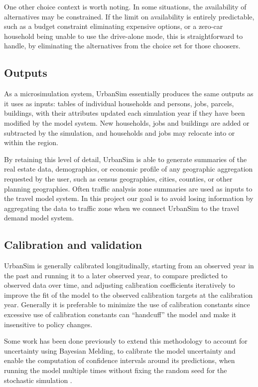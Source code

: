 One other choice context is worth noting. In some situations, the availability of alternatives may be constrained. If the limit on availability is entirely predictable, such as a budget constraint eliminating expensive options, or a zero-car household being unable to use the drive-alone mode, this is straightforward to handle, by eliminating the alternatives from the choice set for those choosers.


\subsection{Outputs}

As a microsimulation system, UrbanSim essentially produces the same outputs as it uses as inputs: tables of individual households and persons, jobs, parcels, buildings, with their attributes updated each simulation year if they have been modified by the model system.  New households, jobs and buildings are added or subtracted by the simulation, and households and jobs may relocate into or within the region.

By retaining this level of detail, UrbanSim is able to generate summaries of the real estate data, demographics, or economic profile of any geographic aggregation requested by the user, such as census geographies, cities, counties, or other planning geographies.  Often traffic analysis zone summaries are used as inputs to the travel model system.  In this project our goal is to avoid losing information by aggregating the data to traffic zone when we connect UrbanSim to the travel demand model system.


\subsection{Calibration and validation}

UrbanSim is generally calibrated longitudinally, starting from an observed year in the past and running it to a later observed year, to compare predicted to observed data over time, and adjusting calibration coefficients iteratively to improve the fit of the model to the observed calibration targets at the calibration year.  Generally it is preferable to minimize the use of calibration constants since excessive use of calibration constants can \enquote{handcuff} the model and make it insensitive to policy changes.

Some work has been done previously to extend this methodology to account for uncertainty using Bayesian Melding, to calibrate the model uncertainty and enable the computation of confidence intervals around its predictions, when running the model multiple times without fixing the random seed for the stochastic simulation \citep{sevcikova-tra-2009, sevcikova-tra-2011}.